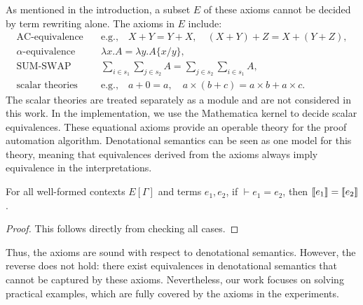 As mentioned in the introduction, a subset \( E \) of these axioms cannot be decided by term rewriting alone. The axioms in \( E \) include:
\[
\begin{aligned}
    \text{AC-equivalence} &\quad \text{e.g.,} \quad X + Y = Y + X, \quad (X + Y) + Z = X + (Y + Z), \\
    \alpha\text{-equivalence} &\quad \lambda x . A = \lambda y . A\{x/y\}, \\
    \text{SUM-SWAP} &\quad \sum_{i \in s_1} \sum_{j \in s_2} A = \sum_{j \in s_2} \sum_{i \in s_1} A, \\
    \text{scalar theories} &\quad \text{e.g.,} \quad a + 0 = a, \quad a \times (b + c) = a \times b + a \times c.
\end{aligned}
\]
The scalar theories are treated separately as a module and are not considered in this work. In the implementation, we use the Mathematica kernel to decide scalar equivalences.
These equational axioms provide an operable theory for the proof automation algorithm. Denotational semantics can be seen as one model for this theory, meaning that equivalences derived from the axioms always imply equivalence in the interpretations.
\begin{lemma}
    For all well-formed contexts \( E[\Gamma] \) and terms \( e_1, e_2 \), if \( \vdash e_1 = e_2 \), then \( {\llbracket e_1 \rrbracket} = {\llbracket e_2 \rrbracket} \).
\end{lemma}
\begin{proof}
    This follows directly from checking all cases.
\end{proof}

Thus, the axioms are sound with respect to denotational semantics. However, the reverse does not hold: there exist equivalences in denotational semantics that cannot be captured by these axioms. Nevertheless, our work focuses on solving practical examples, which are fully covered by the axioms in the experiments.

